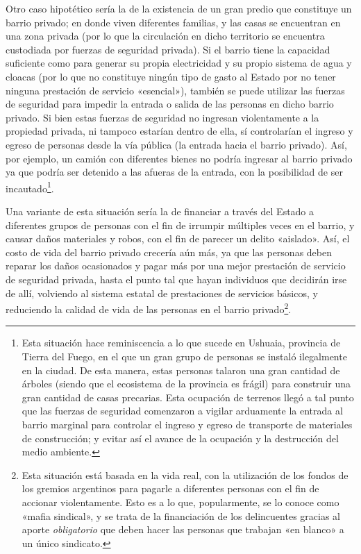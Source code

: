 \documentclass[12pt,a4paper,twoside]{book}
\begin{document}
Otro caso hipotético sería la de la existencia de un gran predio que constituye un barrio privado; en donde viven diferentes familias, y las casas se encuentran en una zona privada (por lo que la circulación en dicho territorio se encuentra custodiada por fuerzas de seguridad privada). Si el barrio tiene la capacidad suficiente como para generar su propia electricidad y su propio sistema de agua y cloacas (por lo que no constituye ningún tipo de gasto al Estado por no tener ninguna prestación de servicio «esencial»), también se puede utilizar las fuerzas de seguridad para impedir la entrada o salida de las personas en dicho barrio privado. Si bien estas fuerzas de seguridad no ingresan violentamente a la propiedad privada, ni tampoco estarían dentro de ella, sí controlarían el ingreso y egreso de personas desde la vía pública (la entrada hacia el barrio privado). Así, por ejemplo, un camión con diferentes bienes no podría ingresar al barrio privado ya que podría ser detenido a las afueras de la entrada, con la posibilidad de ser incautado\footnote{Esta situación hace reminiscencia a lo que sucede en Ushuaia, provincia de Tierra del Fuego, en el que un gran grupo de personas se instaló ilegalmente en la ciudad. De esta manera, estas personas talaron una gran cantidad de árboles (siendo que el ecosistema de la provincia es frágil) para construir una gran cantidad de casas precarias. Esta ocupación de terrenos llegó a tal punto que las fuerzas de seguridad comenzaron a vigilar arduamente la entrada al barrio marginal para controlar el ingreso y egreso de transporte de materiales de construcción; y evitar así el avance de la ocupación y la destrucción del medio ambiente.}.

Una variante de esta situación sería la de financiar a través del Estado a diferentes grupos de personas con el fin de irrumpir múltiples veces en el barrio, y causar daños materiales y robos, con el fin de parecer un delito «aislado». Así, el costo de vida del barrio privado crecería aún más, ya que las personas deben reparar los daños ocasionados y pagar más por una mejor prestación de servicio de seguridad privada, hasta el punto tal que hayan individuos que decidirán irse de allí, volviendo al sistema estatal de prestaciones de servicios básicos, y reduciendo la calidad de vida de las personas en el barrio privado\footnote{Esta situación está basada en la vida real, con la utilización de los fondos de los gremios argentinos para pagarle a diferentes personas con el fin de accionar violentamente. Esto es a lo que, popularmente, se lo conoce como «mafia sindical», y se trata de la financiación de los delincuentes gracias al aporte \textit{obligatorio} que deben hacer las personas que trabajan «en blanco» a un único sindicato.}.
\end{document}
